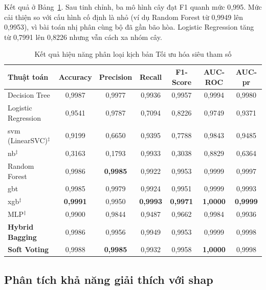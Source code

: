 Kết quả ở Bảng~\ref{tab:exp2_ml_metrics}. Sau tinh chỉnh, ba mô hình cây đạt F1 quanh mức 0{,}995. Mức cải thiện so với cấu hình cố định là nhỏ (ví dụ Random Forest từ 0{,}9949 lên 0{,}9953), vì bài toán nhị phân cùng bộ đã gần bão hòa. Logistic Regression tăng từ 0{,}7991 lên 0{,}8226 nhưng vẫn cách xa nhóm cây.
\begin{table}[htbp]
\centering
\caption{Kết quả hiệu năng phân loại kịch bản Tối ưu hóa siêu tham số}
\label{tab:exp2_ml_metrics}
\small
\begin{tabular*}{\textwidth}{@{\extracolsep{\fill}}lcccccc@{}}
\toprule
\textbf{Thuật toán} & \textbf{Accuracy} & \textbf{Precision} & \textbf{Recall} & \textbf{F1-Score} & \textbf{AUC-ROC} & \textbf{AUC-\ac{pr}} \\ 
\midrule
Decision Tree          & 0{,}9987 & 0{,}9977 & 0{,}9936 & 0{,}9957 & 0{,}9994 & 0{,}9980 \\
Logistic Regression    & 0{,}9541 & 0{,}9787 & 0{,}7094 & 0{,}8226 & 0{,}9749 & 0{,}9371 \\
\ac{svm} (LinearSVC)$^{\ddagger}$ & 0{,}9199 & 0{,}6650 & 0{,}9395 & 0{,}7788 & 0{,}9843 & 0{,}9485 \\
\ac{nb}$^{\ddagger}$ & 0{,}3163 & 0{,}1793 & 0{,}9933 & 0{,}3038 & 0{,}8829 & 0{,}6364 \\
Random Forest          & 0{,}9986 & \textbf{0{,}9985} & 0{,}9922 & 0{,}9953 & 0{,}9999 & 0{,}9997 \\
\ac{gbt}                    & 0{,}9985 & 0{,}9979 & 0{,}9924 & 0{,}9951 & 0{,}9999 & 0{,}9993 \\
\ac{xgb}$^{\ddagger}$ & \textbf{0{,}9991} & 0{,}9950 & \textbf{0{,}9993} & \textbf{0{,}9971} & \textbf{1{,}0000} & \textbf{0{,}9999} \\
MLP$^{\ddagger}$ & 0{,}9900 & 0{,}9844 & 0{,}9487 & 0{,}9662 & 0{,}9984 & 0{,}9936 \\
\midrule
\textbf{Hybrid Bagging}   & 0{,}9986 & 0{,}9956 & 0{,}9949 & 0{,}9953 & 0{,}9999 & 0{,}9998 \\
\textbf{Soft Voting}  & 0{,}9988 & \textbf{0{,}9985} & 0{,}9932 & 0{,}9958 & \textbf{1{,}0000} & 0{,}9998 \\
\bottomrule
\end{tabular*}
\end{table}

\subsection{Phân tích khả năng giải thích với \ac{shap}}

